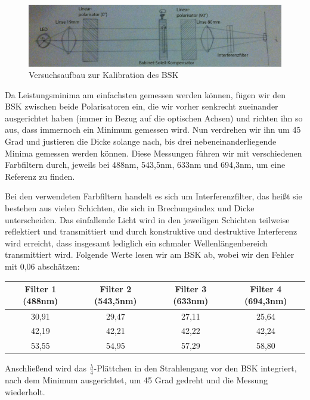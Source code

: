 \documentclass[bigchapter,colorback,accentcolor=tud4b,linedtoc,11pt]{tudreport}
\begin{document}
\begin{figure}[ht!]
\centering
\includegraphics[width=150mm]{img/skizzen/versuch_c_1.jpg}
\caption{Versuchsaufbau zur Kalibration des BSK}
\end{figure}

Da Leistungsminima am einfachsten gemessen werden können, fügen wir den BSK  zwischen beide Polarisatoren ein, die wir vorher senkrecht zueinander ausgerichtet haben (immer in Bezug auf die optischen Achsen) und richten ihn so aus, dass immernoch ein Minimum gemessen wird. Nun verdrehen wir ihn um 45 Grad und justieren die Dicke solange nach, bis drei nebeneinanderliegende Minima gemessen werden können. Diese Messungen führen wir mit verschiedenen Farbfiltern durch, jeweils bei 488nm, 543,5nm, 633nm und 694,3nm, um eine Referenz zu finden.

Bei den verwendeten Farbfiltern handelt es sich um Interferenzfilter, das heißt sie bestehen aus vielen Schichten, die sich in Brechungsindex und Dicke unterscheiden. Das einfallende Licht wird in den jeweiligen Schichten teilweise reflektiert und transmittiert und durch konstruktive und destruktive Interferenz wird erreicht, dass insgesamt lediglich ein schmaler Wellenlängenbereich transmittiert wird. Folgende Werte lesen wir am BSK ab, wobei wir den Fehler mit 0,06 abschätzen: 


\begin{center}
  \begin{tabular}{|c|c|c|c|}
    \hline
        Filter 1 (488nm) & Filter 2 (543,5nm) & Filter 3 (633nm) & Filter 4 (694,3nm) \\ \hline
        30,91 & 29,47 & 27,11 & 25,64 \\ \hline
        42,19 & 42,21 & 42,22 & 42,24 \\ \hline
        53,55 & 54,95 & 57,29 & 58,80 \\ \hline
	\end{tabular}
\end{center}

Anschließend wird das $\frac{\lambda}{4}$-Plättchen in den Strahlengang vor den BSK integriert, nach dem Minimum ausgerichtet, um 45 Grad gedreht und die Messung wiederholt.
\end{document}
